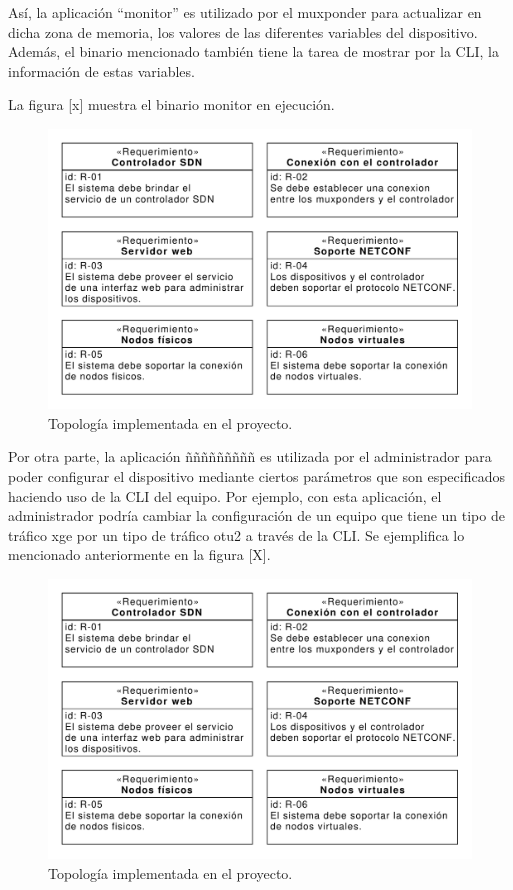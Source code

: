 Así, la aplicación “monitor” es utilizado por el muxponder para actualizar en dicha zona de memoria, los valores de las diferentes variables del dispositivo. Además, el binario mencionado también tiene la tarea de mostrar por la CLI, la información de estas variables. 

La figura [x] muestra el binario monitor en ejecución.

\begin{figure}[H]
    \centering
    \includegraphics[scale=0.65]{Figures/req_sys.pdf}
    \caption{Topología implementada en el proyecto.}
    \label{fig:req_sys}
  \end{figure}

  Por otra parte, la aplicación ñññññññññ es utilizada por el administrador para poder configurar el dispositivo mediante ciertos parámetros que son especificados haciendo uso de la CLI del equipo. Por ejemplo, con esta aplicación, el administrador podría cambiar la configuración de un equipo que tiene un tipo de tráfico xge por un tipo de tráfico otu2 a través de la CLI. Se ejemplifica lo mencionado anteriormente en la figura [X].

  \begin{figure}[H]
    \centering
    \includegraphics[scale=0.65]{Figures/req_sys.pdf}
    \caption{Topología implementada en el proyecto.}
    \label{fig:req_sys}
  \end{figure}

